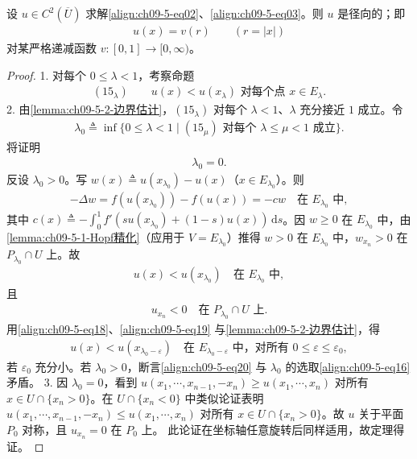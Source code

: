 \documentclass[../../main.tex]{subfiles}
\begin{document}
\begin{theorem}[径向对称性]\label{theorem:ch09-5-2-径向对称}
设 $u\in C^2(\overline{U})$ 求解\eqref{align:ch09-5-eq02}、\eqref{align:ch09-5-eq03}。则 $u$ 是径向的；即
\begin{align*}
u(x)=v(r)\qquad (r=|x|)
\end{align*}
对某严格递减函数 $v:[0,1]\to[0,\infty)$。
\begin{proof}
1. 对每个 $0\leqslant\lambda<1$，考察命题
\begin{align}
(15_\lambda)\qquad u(x)<u(x_\lambda)\text{ 对每个点 }x\in E_\lambda.
\end{align}
2. 由\cref{lemma:ch09-5-2-边界估计}，$(15_\lambda)$ 对每个 $\lambda<1$、$\lambda$ 充分接近 $1$ 成立。令
\begin{align}
\lambda_0\triangleq\inf\{0\leqslant\lambda<1\mid(15_\mu)\text{ 对每个 }\lambda\leqslant\mu<1\text{ 成立}\}.\label{align:ch09-5-eq16}
\end{align}
将证明
\begin{align}
\lambda_0=0.\label{align:ch09-5-eq17}
\end{align}
反设 $\lambda_0>0$。写 $w(x)\triangleq u(x_{\lambda_0})-u(x)$（$x\in E_{\lambda_0}$）。则
\begin{align*}
-\Delta w=f(u(x_{\lambda_0}))-f(u(x))=-cw\quad\text{在 }E_{\lambda_0}\text{ 中},
\end{align*}
其中 $c(x)\triangleq-\int_0^1 f'(su(x_{\lambda_0})+(1-s)u(x))\,\mathrm{d}s$。因 $w\geqslant 0$ 在 $E_{\lambda_0}$ 中，由\cref{lemma:ch09-5-1-Hopf精化}（应用于 $V=E_{\lambda_0}$）推得 $w>0$ 在 $E_{\lambda_0}$ 中，$w_{x_n}>0$ 在 $P_{\lambda_0}\cap U$ 上。故
\begin{align}
u(x)<u(x_{\lambda_0})\quad\text{在 }E_{\lambda_0}\text{ 中},\label{align:ch09-5-eq18}
\end{align}
且
\begin{align}
u_{x_n}<0\quad\text{在 }P_{\lambda_0}\cap U\text{ 上}.\label{align:ch09-5-eq19}
\end{align}
用\eqref{align:ch09-5-eq18}、\eqref{align:ch09-5-eq19} 与\cref{lemma:ch09-5-2-边界估计}，得
\begin{align}
u(x)<u(x_{\lambda_0-\varepsilon})\quad\text{在 }E_{\lambda_0-\varepsilon}\text{ 中，对所有 }0\leqslant\varepsilon\leqslant\varepsilon_0,\label{align:ch09-5-eq20}
\end{align}
若 $\varepsilon_0$ 充分小。若 $\lambda_0>0$，断言\eqref{align:ch09-5-eq20} 与 $\lambda_0$ 的选取\eqref{align:ch09-5-eq16} 矛盾。
3. 因 $\lambda_0=0$，看到 $u(x_1,\cdots,x_{n-1},-x_n)\geqslant u(x_1,\cdots,x_n)$ 对所有 $x\in U\cap\{x_n>0\}$。在 $U\cap\{x_n<0\}$ 中类似论证表明 $u(x_1,\cdots,x_{n-1},-x_n)\leqslant u(x_1,\cdots,x_n)$ 对所有 $x\in U\cap\{x_n>0\}$。故 $u$ 关于平面 $P_0$ 对称，且 $u_{x_n}=0$ 在 $P_0$ 上。
此论证在坐标轴任意旋转后同样适用，故定理得证。
\end{proof}
\end{theorem}
\end{document}
